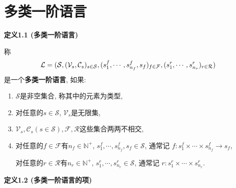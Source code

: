 \documentclass[UTF8]{ctexart}
\begin{document}
\setlength{\abovedisplayskip}{1pt}
\setlength{\belowdisplayskip}{1pt}

\section{多类一阶语言}

\hypertarget{sec:定义1.1}{}
\noindent\textbf{定义1.1 (多类一阶语言)}

称\vspace{-3pt}
\[
\mathcal{L}=(\mathcal{S},(\mathcal{V}_s,\mathcal{C}_s)_{s\in\mathcal{S}},
(s^f_1,\cdots,s^f_{n_f},s_f)_{f\in\mathcal{F}},
(s^r_1,\cdots,s^r_{n_r})_{r\in\mathcal{R}})\\[-3pt]
\]
是一个\textbf{多类一阶语言}, 如果:
\begin{enumerate}
    \item $\mathcal{S}$是非空集合, 称其中的元素为类型,
    \item 对任意的$s\in\mathcal{S}$, $\mathcal{V}_s$是无限集,
    \item $\mathcal{V}_s,\mathcal{C}_s(s\in\mathcal{S}),
    \mathcal{F},\mathcal{R}$这些集合两两不相交,
    \item 对任意的$f\in\mathcal{F}$有$n_f\in\mathbb{N}^+$,
    $s^f_1,\cdots,s^f_{n_f},s_f\in\mathcal{S}$, 通常记
    $f:s^f_1\times\cdots\times s^f_{n_f}\to s_f$,

    \hspace{2.17em}
    对任意的$r\in\mathcal{R}$有$n_r\in\mathbb{N}^+$,
    $s^r_1,\cdots,s^r_{n_r}\in\mathcal{S}$, 通常记
    $r:s^r_1\times\cdots\times s^r_{n_r}$.
\end{enumerate}





\vspace{10pt}

\hypertarget{sec:定义1.2}{}
\noindent\textbf{定义1.2 (多类一阶语言的项)}
\end{document}

